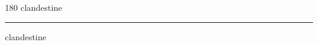 
\begin{frame}
\begin{center}
\begin{turn}{180}
{\fontsize{2.5cm}{1em}\selectfont clandestine}
\end{turn}
\vspace{1em}\par  
\hrule
\vspace{1em}\par  
{\fontsize{2.5cm}{1em}\selectfont clandestine}
\end{center}
\end{frame}
